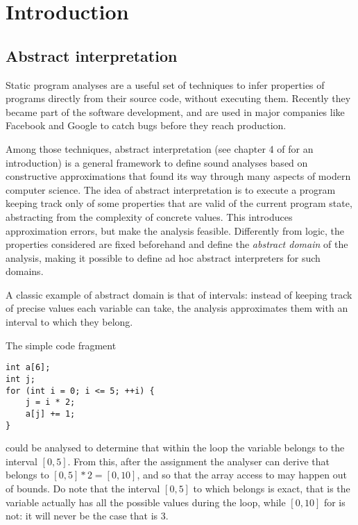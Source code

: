 \chapter{Introduction}\label{ch:intro}
\setcounter{page}{1}
\section{Abstract interpretation}
Static program analyses are a useful set of techniques to infer properties of programs directly from their source code, without executing them. Recently they became part of the software development, and are used in major companies like Facebook \cite{distefano-static-analysis-fb} and Google \cite{static-analysis-google} to catch bugs before they reach production.

Among those techniques, abstract interpretation \cite{cousot-77,cousot-79,cousot-92} (see chapter 4 of \cite{principles-of-program-analysis-book} for an introduction) is a general framework to define sound analyses based on constructive approximations that found its way through many aspects of modern computer science.
The idea of abstract interpretation is to execute a program keeping track only of some properties that are valid of the current program state, abstracting from the complexity of concrete values. This introduces approximation errors, but make the analysis feasible. Differently from logic, the properties considered are fixed beforehand and define the \textit{abstract domain} of the analysis, making it possible to define ad hoc abstract interpreters for such domains.

\begin{example}[Intervals]\label{intr:ex:intervals}
	A classic example of abstract domain is that of intervals: instead of keeping track of precise values each variable can take, the analysis approximates them with an interval to which they belong.

	The simple code fragment
	\begin{verbatim}
int a[6];
int j;
for (int i = 0; i <= 5; ++i) {
	j = i * 2;
	a[j] += 1;
}
	\end{verbatim}
	could be analysed to determine that within the loop the variable  belongs to the interval $[0, 5]$. From this, after the assignment  the analyser can derive that  belongs to $[0, 5] * 2 = [0, 10]$, and so that the array access to  may happen out of bounds.
	Do note that the interval $[0, 5]$ to which  belongs is exact, that is the variable actually has all the possible values during the loop, while $[0, 10]$ for  is not: it will never be the case that  is $3$.
\end{example}

